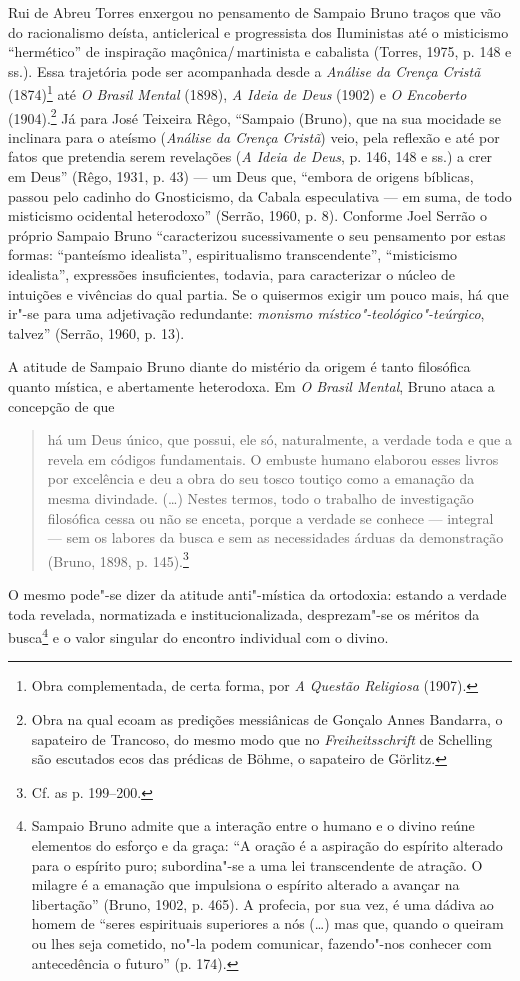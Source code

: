 Rui de Abreu Torres enxergou no pensamento de Sampaio Bruno
traços que vão do racionalismo deísta, anticlerical e
progressista dos Iluministas até o misticismo “hermético” de
inspiração maçônica/\,martinista e cabalista (Torres, 1975, p. 148
e ss.). Essa trajetória pode ser acompanhada desde a
\emph{Análise da Crença Cristã} (1874)\footnote{ Obra
complementada, de certa forma, por \emph{A Questão Religiosa}
(1907).}  até \emph{O Brasil Mental} (1898), \emph{A Ideia
de Deus} (1902) e \emph{O Encoberto} (1904).\footnote{ Obra na
qual ecoam as predições messiânicas de Gonçalo Annes Bandarra, o
sapateiro de Trancoso, do mesmo modo que no
\emph{Freiheitsschrift} de Schelling são escutados ecos das
prédicas de Böhme, o sapateiro de Görlitz.} Já para José
Teixeira Rêgo, “Sampaio (Bruno), que na sua mocidade se
inclinara para o ateísmo (\emph{Análise da Crença Cristã})
veio, pela reflexão e até por fatos que pretendia serem
revelações (\emph{A Ideia de Deus}, p. 146, 148 e ss.) a crer
em Deus” (Rêgo, 1931, p. 43) --- um Deus que, “embora de origens
bíblicas, passou pelo cadinho do Gnosticismo, da Cabala
especulativa --- em suma, de todo misticismo ocidental heterodoxo”
(Serrão, 1960, p. 8). Conforme Joel Serrão o próprio Sampaio
Bruno “caracterizou sucessivamente o seu pensamento por estas
formas: ``panteísmo idealista'', espiritualismo transcendente'',
``misticismo idealista'', expressões insuficientes, todavia, para
caracterizar o núcleo de intuições e vivências do qual partia.
Se o quisermos exigir um pouco mais, há que ir"-se para uma
adjetivação redundante: \emph{monismo
místico"-teológico"-teúrgico}, talvez” (Serrão, 1960, p. 13).

A atitude de Sampaio Bruno diante do mistério da origem é tanto
filosófica quanto mística, e abertamente heterodoxa. Em
\emph{O Brasil Mental}, Bruno ataca a concepção de que 

\begin{quote}
há um Deus único, que possui, ele só, naturalmente, a verdade
toda e que a revela em códigos fundamentais. O embuste humano
elaborou esses livros por excelência e deu a obra do seu tosco
toutiço como a emanação da mesma divindade. (\ldots{}) Nestes termos,
todo o trabalho de investigação filosófica cessa ou não se
enceta, porque a verdade se conhece --- integral --- sem os labores
da busca e sem as necessidades árduas da demonstração (Bruno,
1898, p. 145).\footnote{ Cf. as p. 199--200.}
\end{quote}

O mesmo pode"-se dizer da atitude anti"-mística da ortodoxia:
estando a verdade toda revelada, normatizada e
institucionalizada, desprezam"-se os méritos da busca\footnote{
Sampaio Bruno admite que a interação entre o humano e o divino
reúne elementos do esforço e da graça: “A oração é a aspiração
do espírito alterado para o espírito puro; subordina"-se a uma
lei transcendente de atração. O milagre é a emanação que
impulsiona o espírito alterado a avançar na libertação” (Bruno,
1902, p. 465). A profecia, por sua vez, é uma dádiva ao homem de
“seres espirituais superiores a nós (\ldots{}) mas que, quando o
queiram ou lhes seja cometido, no"-la podem comunicar,
fazendo"-nos conhecer com antecedência o futuro” (p. 174).} e o
valor singular do encontro individual com o divino.

